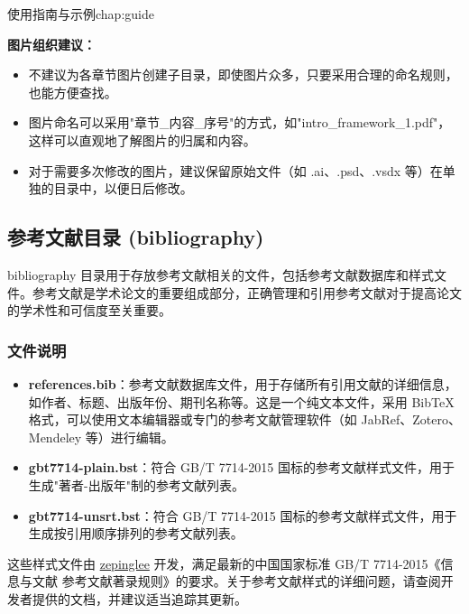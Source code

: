 \begin{cuzchapter}{使用指南与示例}{chap:guide}
\begin{leftbar}
        \noindent\textbf{图片组织建议：}
        \begin{itemize}
            \item 不建议为各章节图片创建子目录，即使图片众多，只要采用合理的命名规则，也能方便查找。
            \item 图片命名可以采用"章节\_内容\_序号"的方式，如"intro\_framework\_1.pdf"，这样可以直观地了解图片的归属和内容。
            \item 对于需要多次修改的图片，建议保留原始文件（如 .ai、.psd、.vsdx 等）在单独的目录中，以便日后修改。
        \end{itemize}
    \end{leftbar}

    \subsection{参考文献目录 (bibliography)}\label{sub:bibliography}

    bibliography 目录用于存放参考文献相关的文件，包括参考文献数据库和样式文件。参考文献是学术论文的重要组成部分，正确管理和引用参考文献对于提高论文的学术性和可信度至关重要。

    \subsubsection{文件说明}\label{subsub:bibliography-files}

    \begin{itemize}
        \item \textbf{references.bib}：参考文献数据库文件，用于存储所有引用文献的详细信息，如作者、标题、出版年份、期刊名称等。这是一个纯文本文件，采用 BibTeX 格式，可以使用文本编辑器或专门的参考文献管理软件（如 JabRef、Zotero、Mendeley 等）进行编辑。

        \item \textbf{gbt7714-plain.bst}：符合 GB/T 7714-2015 国标的参考文献样式文件，用于生成"著者-出版年"制的参考文献列表。

        \item \textbf{gbt7714-unsrt.bst}：符合 GB/T 7714-2015 国标的参考文献样式文件，用于生成按引用顺序排列的参考文献列表。
    \end{itemize}

    这些样式文件由 \href{https://github.com/zepinglee/gbt7714-bibtex-style}{zepinglee} 开发，满足最新的中国国家标准 GB/T 7714-2015《信息与文献 参考文献著录规则》的要求。关于参考文献样式的详细问题，请查阅开发者提供的文档，并建议适当追踪其更新。


\end{cuzchapter}
